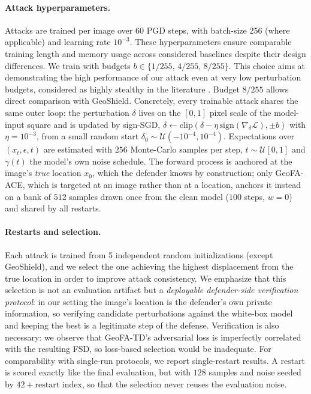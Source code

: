 \paragraph{Attack hyperparameters.}
Attacks are trained per image over 60 PGD steps, with batch-size 256 (where applicable) and
learning rate $10^{-3}$. These hyperparameters ensure comparable training length and memory
usage across considered baselines despite their design differences. We train with budgets
$b \in \{1/255,\, 4/255,\, 8/255\}$. This choice aims at demonstrating the high performance of
our attack even at very low perturbation budgets, considered as highly stealthy in the
literature \citep{kang2024diffattackevasionattacksdiffusionbased,
croce2021robustbenchstandardizedadversarialrobustness}. Budget $8/255$ allows direct
comparison with GeoShield. Concretely, every trainable attack shares the same outer loop: the
perturbation $\delta$ lives on the $[0,1]$ pixel scale of the model-input square and is
updated by sign-SGD, $\delta \leftarrow \mathrm{clip}(\delta - \eta\,\mathrm{sign}(\nabla_\delta
\mathcal{L}), \pm b)$ with $\eta = 10^{-3}$, from a small random start
$\delta_0 \sim \mathcal{U}(-10^{-4}, 10^{-4})$. Expectations over $(x_t, \epsilon, t)$ are
estimated with $256$ Monte-Carlo samples per step, $t \sim \mathcal{U}[0,1]$ and
$\gamma(t)$ the model's own noise schedule. The forward process is anchored at the image's
\emph{true} location $x_0$, which the defender knows by construction; only GeoFA-ACE, which is
targeted at an image rather than at a location, anchors it instead on a bank of $512$ samples
drawn once from the clean model ($100$ steps, $w=0$) and shared by all restarts.

\paragraph{Restarts and selection.}
Each attack is trained from 5 independent random initializations (except GeoShield), and we
select the one achieving the highest displacement from the true location in order to improve
attack consistency. We emphasize that this selection is not an evaluation artifact but a
\emph{deployable defender-side verification protocol}: in our setting the image's location is
the defender's own private information, so verifying candidate perturbations against the
white-box model and keeping the best is a legitimate step of the defense. Verification is also
necessary: we observe that GeoFA-TD's adversarial loss is imperfectly correlated with the
resulting FSD, so loss-based selection would be inadequate. For comparability with single-run
protocols, we report single-restart results. A restart is scored exactly like the final
evaluation, but with $128$ samples and noise seeded by $42 + \text{restart index}$, so that
the selection never reuses the evaluation noise.

